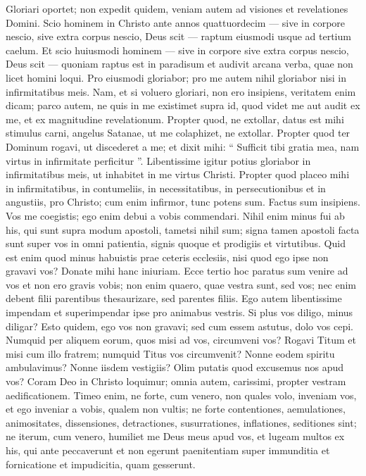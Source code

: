\begin{biblechapter}
\begin{biblechapter}
\begin{biblechapter}
\begin{biblechapter}
\begin{biblechapter}
\begin{biblechapter}
\begin{biblechapter}
\begin{biblechapter}
\begin{biblechapter}
\begin{biblechapter}
\begin{biblechapter}
\begin{biblechapter}
\verse Gloriari oportet; non expedit quidem, veniam autem ad visiones et revelationes Domini. 
\verse Scio hominem in Christo ante annos quattuordecim — sive in corpore nescio, sive extra corpus nescio, Deus scit — raptum eiusmodi usque ad tertium caelum. 
\verse Et scio huiusmodi hominem — sive in corpore sive extra corpus nescio, Deus scit — 
\verse quoniam raptus est in paradisum et audivit arcana verba, quae non licet homini loqui. 
\verse Pro eiusmodi gloriabor; pro me autem nihil gloriabor nisi in infirmitatibus meis. 
\verse Nam, et si voluero gloriari, non ero insipiens, veritatem enim dicam; parco autem, ne quis in me existimet supra id, quod videt me aut audit ex me, 
\verse et ex magnitudine revelationum. Propter quod, ne extollar, datus est mihi stimulus carni, angelus Satanae, ut me colaphizet, ne extollar. 
\verse Propter quod ter Dominum rogavi, ut discederet a me; 
\verse et dixit mihi: “ Sufficit tibi gratia mea, nam virtus in infirmitate perficitur ”. Libentissime igitur potius gloriabor in infirmitatibus meis, ut inhabitet in me virtus Christi. 
\verse Propter quod placeo mihi in infirmitatibus, in contumeliis, in necessitatibus, in persecutionibus et in angustiis, pro Christo; cum enim infirmor, tunc potens sum.
 \verse Factus sum insipiens. Vos me coegistis; ego enim debui a vobis commendari. Nihil enim minus fui ab his, qui sunt supra modum apostoli, tametsi nihil sum; 
\verse signa tamen apostoli facta sunt super vos in omni patientia, signis quoque et prodigiis et virtutibus. 
\verse Quid est enim quod minus habuistis prae ceteris ecclesiis, nisi quod ego ipse non gravavi vos? Donate mihi hanc iniuriam.
 \verse Ecce tertio hoc paratus sum venire ad vos et non ero gravis vobis; non enim quaero, quae vestra sunt, sed vos; nec enim debent filii parentibus thesaurizare, sed parentes filiis. 
\verse Ego autem libentissime impendam et superimpendar ipse pro animabus vestris. Si plus vos diligo, minus diligar?
 \verse Esto quidem, ego vos non gravavi; sed cum essem astutus, dolo vos cepi. 
 \verse Numquid per aliquem eorum, quos misi ad vos, circumveni vos? 
\verse Rogavi Titum et misi cum illo fratrem; numquid Titus vos circumvenit? Nonne eodem spiritu ambulavimus? Nonne iisdem vestigiis?
 \verse Olim putatis quod excusemus nos apud vos? Coram Deo in Christo loquimur; omnia autem, carissimi, propter vestram aedificationem. 
\verse Timeo enim, ne forte, cum venero, non quales volo, inveniam vos, et ego inveniar a vobis, qualem non vultis; ne forte contentiones, aemulationes, animositates, dissensiones, detractiones, susurrationes, inflationes, seditiones sint; 
\verse ne iterum, cum venero, humiliet me Deus meus apud vos, et lugeam multos ex his, qui ante peccaverunt et non egerunt paenitentiam super immunditia et fornicatione et impudicitia, quam gesserunt.
 

\end{biblechapter}
\end{biblechapter}
\end{biblechapter}
\end{biblechapter}
\end{biblechapter}
\end{biblechapter}
\end{biblechapter}
\end{biblechapter}
\end{biblechapter}
\end{biblechapter}
\end{biblechapter}
\end{biblechapter}
